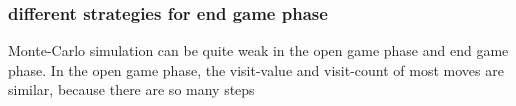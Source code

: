 \subsubsection{different strategies for end game phase}
Monte-Carlo simulation can be quite weak in the open game phase and end game phase. In the open game phase, the visit-value and visit-count of most moves are similar, because there are so many steps






